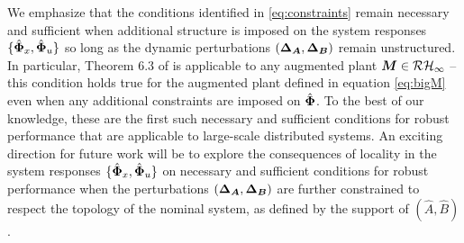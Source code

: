We emphasize that the conditions identified in \eqref{eq:constraints} remain necessary and sufficient when additional structure is imposed on the system responses $\{\hat{\boldsymbol{\Phi}}_x,\hat{\boldsymbol{\Phi}}_u\}$ so long as the dynamic perturbations $({\boldsymbol{\Delta}}_{\boldsymbol{A}},{\boldsymbol{\Delta}}_{\boldsymbol{B}})$ remain unstructured.  In particular, Theorem 6.3 of \cite{khammash1990stability} is applicable to any augmented plant $\boldsymbol{M} \in \mathcal{RH}_\infty$ -- this condition holds true for the augmented plant defined in equation \eqref{eq:bigM} even when any additional constraints are imposed on $\hat{\boldsymbol{\Phi}}$.  To the best of our knowledge, these are the first such necessary and sufficient conditions for robust performance that are applicable to large-scale distributed systems.  An exciting direction for future work will be to explore the consequences of locality in the system responses $\{\hat{\boldsymbol{\Phi}}_x,\hat{\boldsymbol{\Phi}}_u\}$ on necessary and sufficient conditions for robust performance when the perturbations $({\boldsymbol{\Delta}}_{\boldsymbol{A}},{\boldsymbol{\Delta}}_{\boldsymbol{B}})$ are further constrained to respect the topology of the nominal system, as defined by the support of $(\hat A, \hat B)$.
%
